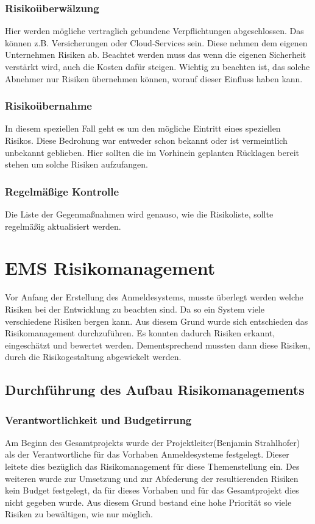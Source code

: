 \subsubsection{Risikoüberwälzung}
Hier werden mögliche vertraglich gebundene Verpflichtungen abgeschlossen. Das können z.B. Versicherungen oder Cloud-Services sein. Diese nehmen dem eigenen Unternehmen Risiken ab. Beachtet werden muss das wenn die eigenen Sicherheit verstärkt wird, auch die Kosten dafür steigen. Wichtig zu beachten ist, das solche Abnehmer nur Risiken übernehmen können, worauf dieser Einfluss haben kann.

\subsubsection{Risikoübernahme}
In diesem speziellen Fall geht es um den mögliche Eintritt eines speziellen Risikos. Diese Bedrohung war entweder schon bekannt oder ist vermeintlich unbekannt geblieben. Hier sollten die im Vorhinein geplanten Rücklagen bereit stehen um solche Risiken aufzufangen.

\subsubsection{Regelmäßige Kontrolle}
Die Liste der Gegenmaßnahmen wird genauso, wie die Risikoliste, sollte regelmäßig aktualisiert werden.  

\section{EMS Risikomanagement}
Vor Anfang der Erstellung des Anmeldesystems, musste überlegt werden welche Risiken bei der Entwicklung zu beachten sind. Da so ein System viele verschiedene Risiken bergen kann. Aus diesem Grund wurde sich entschieden das Risikomanagement durchzuführen. Es konnten dadurch Risiken erkannt, eingeschätzt und bewertet werden. Dementsprechend mussten dann diese Risiken, durch die Risikogestaltung abgewickelt werden.

\subsection{Durchführung des Aufbau Risikomanagements}
\subsubsection{Verantwortlichkeit und Budgetirrung}
Am Beginn des Gesamtprojekts wurde der Projektleiter(Benjamin Strahlhofer) als der Verantwortliche für das Vorhaben Anmeldesysteme festgelegt. Dieser leitete dies bezüglich das Risikomanagement für diese Themenstellung ein.
Des weiteren wurde zur Umsetzung und zur Abfederung der resultierenden Risiken kein Budget festgelegt, da für dieses Vorhaben und für das Gesamtprojekt dies nicht gegeben wurde.
Aus diesem Grund bestand eine hohe Priorität so viele Risiken zu bewältigen, wie nur möglich.

